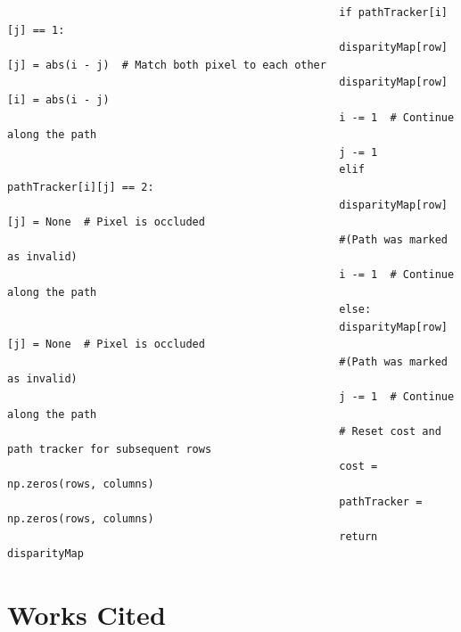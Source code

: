 \documentclass[11pt]{scrartcl}
\begin{document}
\begin{verbatim}
													if pathTracker[i][j] == 1:
													disparityMap[row][j] = abs(i - j)  # Match both pixel to each other
													disparityMap[row][i] = abs(i - j)
													i -= 1  # Continue along the path
													j -= 1
													elif pathTracker[i][j] == 2:
													disparityMap[row][j] = None  # Pixel is occluded 
													#(Path was marked as invalid)
													i -= 1  # Continue along the path
													else:
													disparityMap[row][j] = None  # Pixel is occluded 
													#(Path was marked as invalid)
													j -= 1  # Continue along the path
													# Reset cost and path tracker for subsequent rows
													cost = np.zeros(rows, columns)
													pathTracker = np.zeros(rows, columns)
													return disparityMap
												\end{verbatim}
												\section{Works Cited}
												\renewcommand{\section}[2]{}%
\end{document}
